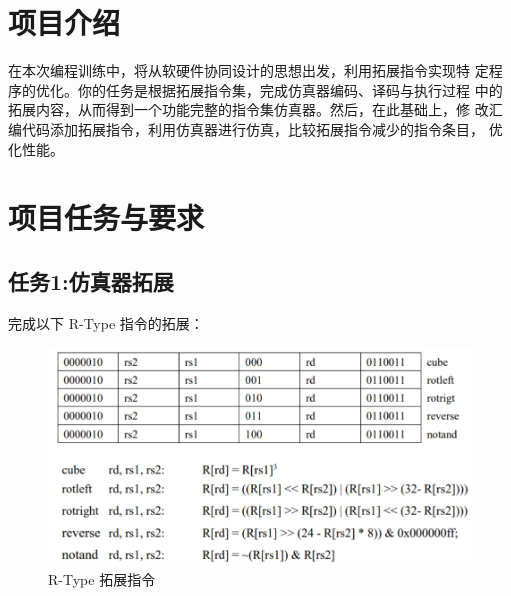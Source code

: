 \documentclass[12pt,hyperref,a4paper,UTF8]{ctexart}
\begin{document}
\cover

%
%

\thispagestyle{empty} %

\newpage
\tableofcontents

\newpage


\section{项目介绍}
在本次编程训练中，将从软硬件协同设计的思想出发，利用拓展指令实现特
定程序的优化。你的任务是根据拓展指令集，完成仿真器编码、译码与执行过程
中的拓展内容，从而得到一个功能完整的指令集仿真器。然后，在此基础上，修
改汇编代码添加拓展指令，利用仿真器进行仿真，比较拓展指令减少的指令条目，
优化性能。

\section{项目任务与要求}

\subsection*{任务1:仿真器拓展}
完成以下 R-Type 指令的拓展：

  \begin{figure}[H]
      \centering
      \includegraphics[width =1.0\textwidth]{figures/fig/image1.png}
      \caption{R-Type 拓展指令}
  \end{figure}
\end{document}
